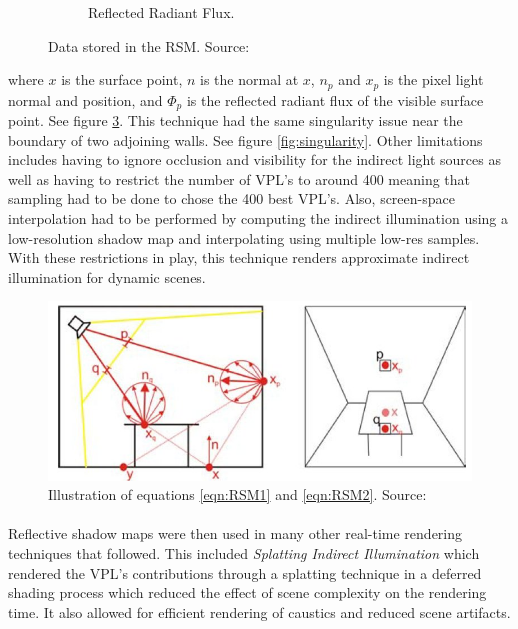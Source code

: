 \begin{figure}
\begin{subfigure}[b]{0.4\textwidth}
                \caption{Reflected Radiant Flux.}
                \label{fig:RSM3}
        \end{subfigure}
        \caption{Data stored in the RSM. Source: \protect\cite{Dachsbacher2005}}\label{fig:RSM}
\end{figure}

where $x$ is the surface point, $n$ is the normal at $x$, $n_{p}$ and $x_{p}$ is the pixel light normal and position, and $\Phi_{p}$ is the reflected radiant flux of the visible surface point.  See figure \ref{fig:RSMcalc}.  This technique had the same singularity issue near the boundary of two adjoining walls.  See figure \ref{fig:singularity}.  Other limitations includes having to ignore occlusion and visibility for the indirect light sources as well as having to restrict the number of VPL's to around 400 meaning that sampling had to be done to chose the 400 best VPL's.  Also, screen-space interpolation had to be performed by computing the indirect illumination using a low-resolution shadow map and interpolating using multiple low-res samples.  With these restrictions in play, this technique renders approximate indirect illumination for dynamic scenes.

\begin{figure}[h!]
  \centering
    \includegraphics[width=1.0\textwidth]{RSMcalc.jpg}
  \caption{Illustration of equations \ref{eqn:RSM1} and \ref{eqn:RSM2}. Source: \protect\cite{Dachsbacher2005}}
	\label{fig:RSMcalc}
\end{figure}

\paragraph{}
Reflective shadow maps were then used in many other real-time rendering techniques that followed.  This included \textit{Splatting Indirect Illumination} \cite{Dachsbacher2006} which rendered the VPL's contributions through a splatting technique in a deferred shading process which reduced the effect of scene complexity on the rendering time.  It also allowed for efficient rendering of caustics and reduced scene artifacts.

